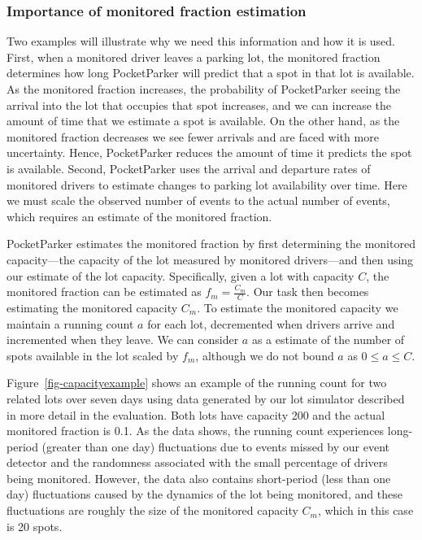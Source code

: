 \subsubsection{Importance of monitored fraction estimation}

Two examples will illustrate why we need this information and how it is used.
First, when a monitored driver leaves a parking lot, the monitored fraction
determines how long PocketParker will predict that a spot in that lot is
available. As the monitored fraction increases, the probability of
PocketParker seeing the arrival into the lot that occupies that spot
increases, and we can increase the amount of time that we estimate a spot is
available. On the other hand, as the monitored fraction decreases we see
fewer arrivals and are faced with more uncertainty. Hence, PocketParker
reduces the amount of time it predicts the spot is available. Second,
PocketParker uses the arrival and departure rates of monitored drivers to
estimate changes to parking lot availability over time. Here we must scale
the observed number of events to the actual number of events, which requires
an estimate of the monitored fraction.

PocketParker estimates the monitored fraction by first determining the
monitored capacity---the capacity of the lot measured by monitored
drivers---and then using our estimate of the lot capacity. Specifically,
given a lot with capacity $C$, the monitored fraction can be estimated as
$f_m = \frac{C_m}{C}$. Our task then becomes estimating the monitored
capacity $C_m$. To estimate the monitored capacity we maintain a running
count $a$ for each lot, decremented when drivers arrive and incremented when
they leave. We can consider $a$ as a estimate of the number of spots
available in the lot scaled by $f_m$, although we do not bound $a$ as $0 \le
a \le C$.

Figure~\ref{fig-capacityexample} shows an example of the running count for
two related lots over seven days using data generated by our lot simulator
described in more detail in the evaluation. Both lots have capacity 200 and
the actual monitored fraction is 0.1. As the data shows, the running count
experiences long-period (greater than one day) fluctuations due to events
missed by our event detector and the randomness associated with the small
percentage of drivers being monitored. However, the data also contains
short-period (less than one day) fluctuations caused by the dynamics of the
lot being monitored, and these fluctuations are roughly the size of the
monitored capacity $C_m$, which in this case is 20 spots.


